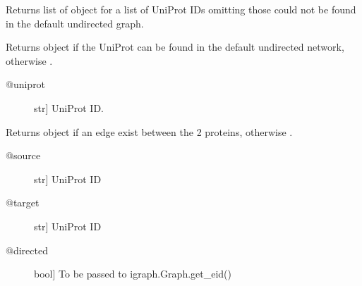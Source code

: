 \documentclass[letterpaper,10pt,english]{sphinxmanual}
\begin{document}
\begin{fulllineitems}
\begin{fulllineitems}
\begin{description}
\end{description}

\end{fulllineitems}


\begin{fulllineitems}
\label{\detokenize{main:pypath.main.PyPath.uniprots}}
Returns list of  object
for a list of UniProt IDs omitting those
could not be found in the default
undirected graph.

\end{fulllineitems}


\begin{fulllineitems}
\label{\detokenize{main:pypath.main.PyPath.up}}
Returns  object if the UniProt
can be found in the default undirected network,
otherwise .
\begin{description}
\item[{@uniprot}] \leavevmode{[}str{]}
UniProt ID.

\end{description}

\end{fulllineitems}


\begin{fulllineitems}
\label{\detokenize{main:pypath.main.PyPath.up_edge}}
Returns  object if an edge exist between
the 2 proteins, otherwise .
\begin{description}
\item[{@source}] \leavevmode{[}str{]}
UniProt ID

\item[{@target}] \leavevmode{[}str{]}
UniProt ID

\item[{@directed}] \leavevmode{[}bool{]}
To be passed to igraph.Graph.get\_eid()


\end{description}
\end{fulllineitems}
\end{fulllineitems}
\end{document}
